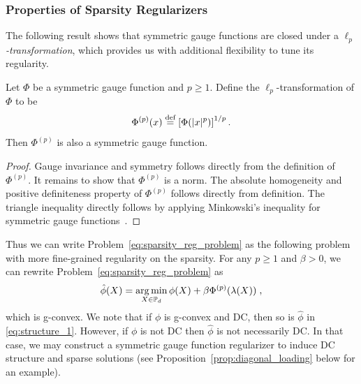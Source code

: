 \documentclass[sn-nature]{sn-jnl}%
\theoremstyle{thmstyleone}%
\theoremstyle{thmstyletwo}%
\theoremstyle{thmstylethree}%
\begin{document}
\subsubsection{Properties of Sparsity Regularizers}
The following result shows that symmetric gauge functions are closed under a $\ell_p$\textit{-transformation}, which provides us with additional flexibility to tune its regularity. 
%
    \begin{prop}\label{prop:lp_sgf}
        Let $\Phi$ be a symmetric gauge function and $p \geq 1$. Define the $\ell_p$-transformation of $\Phi$ to be
        \[
        \Phi^{(p)}(x) \stackrel{\text{def}}{=} \left[ \Phi(|x|^p) \right]^{1/p}.
        \]
        Then $\Phi^{(p)}$ is also a symmetric gauge function.
    \end{prop}
%
\begin{proof}
    Gauge invariance and symmetry follows directly from the definition of $\Phi^{(p)}$. It remains to show that $\Phi^{(p)}$ is a norm. The absolute homogeneity and positive definiteness property of $\Phi^{(p)}$ follows directly from definition. The triangle inequality directly follows by applying  Minkowski's inequality for symmetric gauge functions~\cite[Theorem IV.1.8]{bhatia97}.
\end{proof}
Thus we can write Problem~\ref{eq:sparsity_reg_problem} as the following problem with more fine-grained regularity on the sparsity. For any $p \geq 1$ and $\beta > 0$, we can rewrite Problem~\ref{eq:sparsity_reg_problem} as
\begin{equation}\label{eq:structure_1}
    \hat{\phi}(X) = \operatorname*{arg\,min}_{X \in \mathbb{P}_d } \phi(X) + \beta \Phi^{(p)}(\lambda(X))    \; ,
\end{equation}
which is g-convex.  We note that if $\phi$ is g-convex and DC, then so is $\hat{\phi}$ in \eqref{eq:structure_1}. However, if $\phi$ is not DC then $\hat{\phi}$ is not necessarily DC. In that case, we may construct a symmetric gauge function regularizer to induce DC structure and sparse solutions (see Proposition~\ref{prop:diagonal_loading} below for an example).


\end{document}
